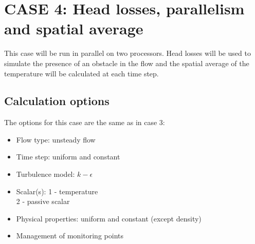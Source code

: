 
%
%
%
%


\newpage
\section{CASE 4: Head losses, parallelism and spatial average}
\label{prg_case4}%
This case will be run in parallel on two processors. Head losses will be used to
simulate the presence of an obstacle in the flow and the spatial average of the
temperature will be calculated at each time step.

        \subsection{Calculation options}

The options for this case are the same as in case 3:
\begin{itemize}
\renewcommand{\labelitemi}{$\rightarrow$}
        \item Flow type: unsteady flow
        \item Time step: uniform and constant
        \item Turbulence model: $k-\epsilon$
        \item Scalar(s): 1 - temperature\\
      \hspace*{1.6cm} 2 - passive scalar
        \item Physical properties: uniform and constant (except density)
        \item Management of monitoring points
\end{itemize}


